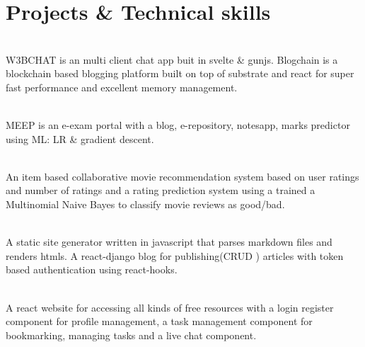\documentclass[]{assets/deedy-resume-openfont}
\begin{document}
\section{Projects \& Technical skills}
\raggedright

     \hfill {}\\
    W3BCHAT is an multi client chat app buit in svelte \& gunjs. Blogchain is a blockchain based blogging platform built on top of substrate and react for super fast performance and excellent memory management.\\
    \sectionsep

    \hfill {}\\
    MEEP is an e-exam portal with a blog, e-repository, notesapp, marks predictor using ML: LR \& gradient descent.\\
    \sectionsep
  

    \hfill {}\\
    An item based collaborative movie recommendation system based on user ratings and number of ratings and a rating prediction system using a trained a Multinomial Naive Bayes to classify movie reviews as good/bad.\\
    \sectionsep
  

    \hfill {}\\
    A static site generator written in javascript that parses markdown files and renders htmls. A react-django blog for publishing(CRUD ) articles with token based authentication using react-hooks. \\
    \sectionsep
  

    \hfill {}\\
    A react website for accessing all kinds of free resources with a login register component for profile management, a task management component for bookmarking, managing tasks and a live chat component.\\
    \sectionsep
%
%
\end{document}
